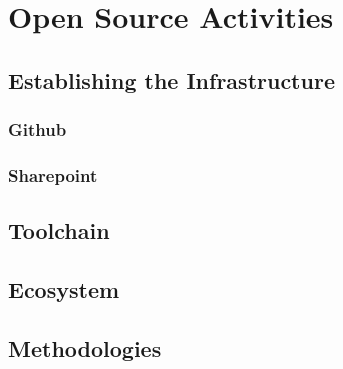 ﻿\section{Open Source Activities}

\subsection{Establishing the Infrastructure}

\subsubsection{Github}

\subsubsection{Sharepoint}

\subsection{Toolchain}

\subsection{Ecosystem}

\subsection{Methodologies}
